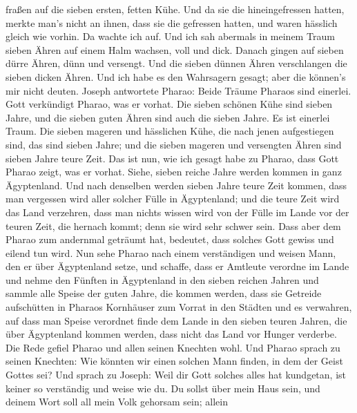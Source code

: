 fraßen auf die sieben ersten, fetten Kühe.  Und da sie
die hineingefressen hatten, merkte man's nicht an ihnen, dass sie die
gefressen hatten, und waren hässlich gleich wie vorhin. Da wachte ich
auf.  Und ich sah abermals in meinem Traum sieben Ähren
auf einem Halm wachsen, voll und dick.  Danach gingen auf
sieben dürre Ähren, dünn und versengt.  Und die sieben
dünnen Ähren verschlangen die sieben dicken Ähren. Und ich habe es den
Wahrsagern gesagt; aber die können's mir nicht deuten. 
Joseph antwortete Pharao: Beide Träume Pharaos sind einerlei. Gott
verkündigt Pharao, was er vorhat.  Die sieben schönen
Kühe sind sieben Jahre, und die sieben guten Ähren sind auch die sieben
Jahre. Es ist einerlei Traum.  Die sieben mageren und
hässlichen Kühe, die nach jenen aufgestiegen sind, das sind sieben
Jahre; und die sieben mageren und versengten Ähren sind sieben Jahre
teure Zeit.  Das ist nun, wie ich gesagt habe zu Pharao,
dass Gott Pharao zeigt, was er vorhat.  Siehe, sieben
reiche Jahre werden kommen in ganz Ägyptenland.  Und nach
denselben werden sieben Jahre teure Zeit kommen, dass man vergessen wird
aller solcher Fülle in Ägyptenland; und die teure Zeit wird das Land
verzehren,  dass man nichts wissen wird von der Fülle im
Lande vor der teuren Zeit, die hernach kommt; denn sie wird sehr schwer
sein.  Dass aber dem Pharao zum andernmal geträumt hat,
bedeutet, dass solches Gott gewiss und eilend tun wird. 
Nun sehe Pharao nach einem verständigen und weisen Mann, den er über
Ägyptenland setze,  und schaffe, dass er Amtleute
verordne im Lande und nehme den Fünften in Ägyptenland in den sieben
reichen Jahren  und sammle alle Speise der guten Jahre,
die kommen werden, dass sie Getreide aufschütten in Pharaos Kornhäuser
zum Vorrat in den Städten und es verwahren,  auf dass man
Speise verordnet finde dem Lande in den sieben teuren Jahren, die über
Ägyptenland kommen werden, dass nicht das Land vor Hunger verderbe.
 Die Rede gefiel Pharao und allen seinen Knechten wohl.
 Und Pharao sprach zu seinen Knechten: Wie könnten wir
einen solchen Mann finden, in dem der Geist Gottes sei? 
Und sprach zu Joseph: Weil dir Gott solches alles hat kundgetan, ist
keiner so verständig und weise wie du.  Du sollst über
mein Haus sein, und deinem Wort soll all mein Volk gehorsam sein; allein
